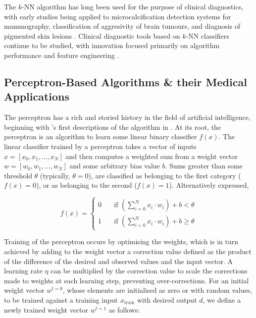 The $k$-NN algorithm has long been used for the purpose of clinical diagnostics, with early studies being applied to microcalcification detection systems for mammography, classification of aggresivity of brain tumours, and diagnosis of pigmented skin lesions \citep{knn_microcalc,knn_braintumours,knn_skinlesions}. Clinical diagnostic tools based on $k$-NN classifiers continue to be studied, with innovation focused primarily on algorithm performance and feature engineering \citep{dhahbi2015}.

\subsection{Perceptron-Based Algorithms \& their Medical Applications}

The perceptron has a rich and storied history in the field of artificial intelligence, beginning with \citeauthor{rosenblatt1957}'s first descriptions of the algorithm in \citeyear{rosenblatt1957}. At its root, the perceptron is an algorithm to learn some linear binary classifier $f(x)$. The linear classifier trained by a perceptron takes a vector of inputs $x = \left[ x_0, x_1,\ldots,x_N \right]$ and then computes a weighted sum from a weight vector $w = \left[ w_0,w_1,\ldots,w_N\right]$ and some arbitrary bias value $b$. Sums greater than some threshold $\theta$ (typically, $\theta=0$), are classified as belonging to the first category ($f(x)=0$), or as belonging to the second ($f(x)=1$). Alternatively expressed,

$$
f(x) = \left\{
        \begin{array}{ll}
            0 & \quad \textrm{if } \left(\displaystyle\sum_{i=0}^N x_i \cdot w_i\right) + b  < \theta \\
            1 & \quad \textrm{if } \left(\displaystyle\sum_{i=0}^N x_i \cdot w_i\right) + b \geq \theta
        \end{array}
    \right.
$$

Training of the perceptron occurs by optimising the weights, which is in turn achieved by adding to the weight vector a correction value defined as the product of the difference of the desired and observed values and the input vector. A learning rate $\eta$ can be multiplied by the correction value to scale the corrections made to weights at each learning step, preventing over-corrections. For an initial weight vector $w^{t=0}$, whose elements are initialised as zero or with random values, to be trained against a training input $x_{\textrm{train}}$ with desired output $d$, we define a newly trained weight vector $w^{t=1}$ as follows:

